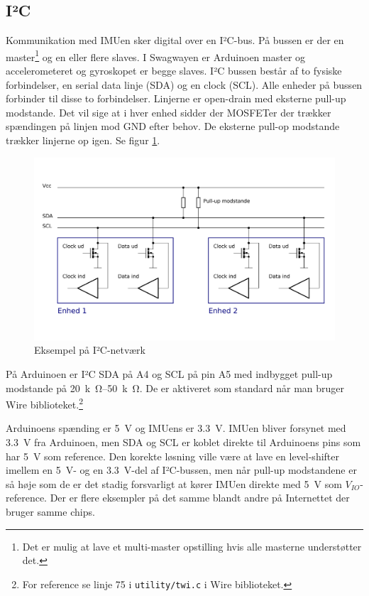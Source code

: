 \documentclass[a4paper,oneside,article,danish,table]{memoir}
\begin{document}
\subsection{I²C}
Kommunikation med IMUen sker digital over en I²C-bus. På bussen er der en master\footnote{Det er mulig at lave et multi-master opstilling hvis alle masterne understøtter det.} og en eller flere slaves. I Swagwayen er Arduinoen master og accelerometeret og gyroskopet er begge slaves. I²C bussen består af to fysiske forbindelser, en serial data linje (SDA) og en clock (SCL). Alle enheder på bussen forbinder til disse to forbindelser. Linjerne er open-drain med eksterne pull-up modstande. Det vil sige at i hver enhed sidder der MOSFETer der trækker spændingen på linjen mod GND efter behov. De eksterne pull-op modstande trækker linjerne op igen. Se figur \ref{fig:i2cbasic}.
\begin{figure}[htbp]
  \centering
  \includegraphics[width=\textwidth]{pictures/I2Cbasic.pdf}
  \caption{Eksempel på I²C-netværk}
  \label{fig:i2cbasic}
\end{figure}

På Arduinoen er I²C SDA på A4 og SCL på pin A5 med indbygget pull-up modstande på \SI{20}{k\ohm}--\SI{50}{k\ohm}. \cite[s. 317]{atmega} De er aktiveret som standard når man bruger Wire biblioteket.\footnote{For reference se linje 75 i \texttt{utility/twi.c} i Wire biblioteket.}

Arduinoens spænding er \SI{5}{V} og IMUens er \SI{3,3}{V}. IMUen bliver forsynet med \SI{3,3}{V} fra Arduinoen, men SDA og SCL er koblet direkte til Arduinoens pins som har \SI{5}{V} som reference. Den korekte løsning ville være at lave en level-shifter imellem en \SI{5}{V}- og en \SI{3,3}{V}-del af I²C-bussen, men når pull-up modstandene er så høje som de er det stadig forsvarligt at kører IMUen direkte med \SI{5}{V} som $V_{IO}$-reference. Der er flere eksempler på det samme blandt andre på Internettet der bruger samme chips.
\end{document}
